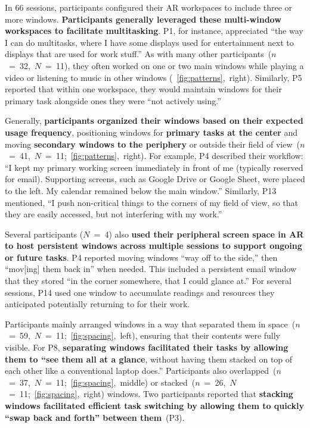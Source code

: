 In 66 sessions, 
participants configured their AR workspaces to include three or more windows.
\textbf{Participants generally leveraged these multi-window workspaces to facilitate multitasking}.
P1, for instance, appreciated ``the way I can do multitasks, where I have some displays used for entertainment next to displays that are used for work stuff.''
As with many other participants~($n$~=~32,~$N$~=~11), 
they often worked on one or two main windows while playing a video or listening to music in other windows (\eg~\autoref{fig:patterns},~right).
Similarly, P5 reported that within one workspace, they would maintain windows for their primary task alongside ones they were ``not actively using.''

Generally, \textbf{participants organized their windows based on their expected usage frequency}, positioning windows for \textbf{primary tasks at the center} and moving \textbf{secondary windows to the periphery} or outside their field of view~($n$~=~41,~$N$~=~11;~\autoref{fig:patterns},~right).
For example, P4 described their workflow: ``I kept my primary working screen immediately in front of me (typically reserved for email). Supporting screens, such as Google Drive or Google Sheet, were placed to the left. My calendar remained below the main window.''
Similarly, P13 mentioned, ``I push non-critical things to the corners of my field of view, so that they are easily accessed, but not interfering with my work.'' 

Several participants ($N$~=~4)
also \textbf{used their peripheral screen space in AR to host persistent windows across multiple sessions to support ongoing or future tasks}. 
P4 reported moving windows ``way off to the side,'' then ``mov[ing] them back in'' when needed. 
This included a persistent email window that they stored ``in the corner somewhere, that I could glance at.''
For several sessions, P14 used one window to accumulate readings and resources they anticipated potentially returning to for their work.

Participants mainly arranged windows in a way that separated them in space~($n$~=~59,~$N$~=~11;~\autoref{fig:spacing},~left), 
ensuring that their contents were fully visible. 
For P8, \textbf{separating windows facilitated their tasks by allowing them to ``see them all at a glance}, without having them stacked on top of each other like a conventional laptop does.''
Participants also overlapped~($n$~=~37,~$N$~=~11;~\autoref{fig:spacing},~middle) or stacked~($n$~=~26,~$N$~=~11;~\autoref{fig:spacing},~right) windows.
Two participants reported that \textbf{stacking windows facilitated efficient task switching by allowing them to quickly ``swap back and forth'' between them}~(P3).



